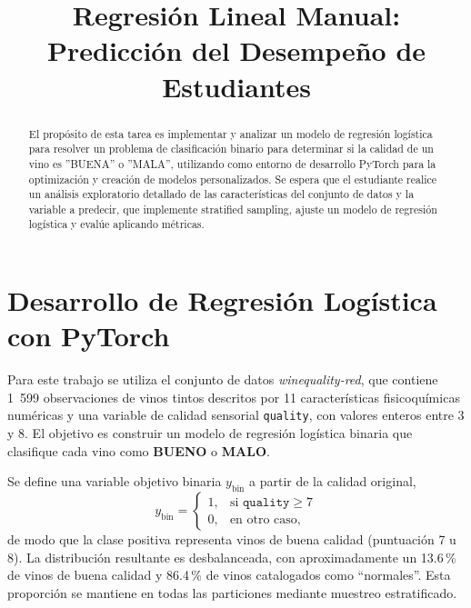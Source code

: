 \documentclass[conference]{IEEEtran}
\begin{document}
\title{Regresión Lineal Manual: Predicción del Desempeño de Estudiantes}

\author{
}

\maketitle

\begin{abstract}
El propósito de esta tarea es implementar y analizar un
modelo de regresión logística para resolver un problema de
clasificación binario para determinar si la calidad de un
vino es ”BUENA” o ”MALA”, utilizando como entorno de
desarrollo PyTorch para la optimización y creación de modelos
personalizados.
Se espera que el estudiante realice un análisis exploratorio
detallado de las características del conjunto de datos y la
variable a predecir, que implemente stratified sampling, ajuste
un modelo de regresión logística y evalúe aplicando métricas.
\end{abstract}

\section{Desarrollo de Regresión Logística con PyTorch}

Para este trabajo se utiliza el conjunto de datos \textit{winequality-red}, que
contiene 1~599 observaciones de vinos tintos descritos por 11 características
fisicoquímicas numéricas y una variable de calidad sensorial
\texttt{quality}, con valores enteros entre 3 y 8. El objetivo es construir un
modelo de regresión logística binaria que clasifique cada vino como
\textbf{BUENO} o \textbf{MALO}.

Se define una variable objetivo binaria $y_{\text{bin}}$ a partir de la
calidad original,
\begin{equation}
    y_{\text{bin}} =
    \begin{cases}
        1, & \text{si } \texttt{quality} \geq 7 \\[2pt]
        0, & \text{en otro caso},
    \end{cases}
\end{equation}
de modo que la clase positiva representa vinos de buena calidad (puntuación 7 u
8). La distribución resultante es desbalanceada, con aproximadamente un
13.6\,\% de vinos de buena calidad y 86.4\,\% de vinos catalogados como
``normales''. Esta proporción se mantiene en todas las particiones mediante
muestreo estratificado.
\end{document}
